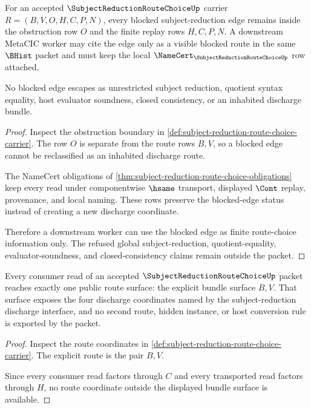 \begin{theorem}
\label{thm:subject-reduction-route-choice-blocked-edge-nonescape}
For an accepted $\SubjectReductionRouteChoiceUp$ carrier $R=(B,V,O,H,C,P,N)$, every blocked subject-reduction edge remains inside the obstruction row $O$ and the finite replay rows $H,C,P,N$. A downstream MetaCIC worker may cite the edge only as a visible blocked route in the same $\BHist$ packet and must keep the local $\NameCert_{\SubjectReductionRouteChoiceUp}$ row attached.

No blocked edge escapes as unrestricted subject reduction, quotient syntax equality, host evaluator soundness, closed consistency, or an inhabited discharge bundle.
\end{theorem}
\begin{proof}
Inspect the obstruction boundary in \autoref{def:subject-reduction-route-choice-carrier}. The row $O$ is separate from the route rows $B,V$, so a blocked edge cannot be reclassified as an inhabited discharge route.

The NameCert obligations of \autoref{thm:subject-reduction-route-choice-obligations} keep every read under componentwise $\hsame$ transport, displayed $\Cont$ replay, provenance, and local naming. These rows preserve the blocked-edge status instead of creating a new discharge coordinate.

Therefore a downstream worker can use the blocked edge as finite route-choice information only. The refused global subject-reduction, quotient-equality, evaluator-soundness, and closed-consistency claims remain outside the packet.
\end{proof}

\begin{theorem}
\label{thm:subject-reduction-route-choice-bundle-typeclass-exhaustion}
Every consumer read of an accepted $\SubjectReductionRouteChoiceUp$ packet reaches exactly one public route surface: the explicit bundle surface $B,V$. That surface exposes the four discharge coordinates named by the subject-reduction discharge interface, and no second route, hidden instance, or host conversion rule is exported by the packet.
\end{theorem}
\begin{proof}
Inspect the route coordinates in \autoref{def:subject-reduction-route-choice-carrier}. The explicit route is the pair $B,V$.

Since every consumer read factors through $C$ and every transported read factors through $H$, no route coordinate outside the displayed bundle surface is available.
\end{proof}

